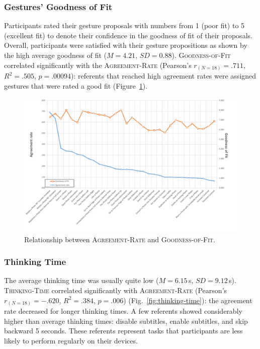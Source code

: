 \subsubsection{Gestures' Goodness of Fit}
Participants rated their gesture proposals with numbers from 1 (poor fit) to 5 (excellent fit) to denote their confidence in the goodness of fit of their proposals. Overall, participants were satisfied with their gesture propositions as shown by the high average goodness of fit ($M{=}4.21$, $SD{=}0.88$).
\textsc{Goodness-of-Fit} correlated significantly with the \textsc{Agreement-Rate} (Pearson's $r_{(N{=}18)}{=}.711$, $R^2{=}.505$, $p{=}.00094$): referents that reached high agreement rates were assigned gestures that were rated a good fit (Figure~\ref{fig:goodness-of-fit}).

\begin{figure}[ht]
	\centering
	\captionsetup{justification=centering}
	\includegraphics[width=.95\linewidth]{Figures/App-LUIGES/goodness-of-fit.pdf}
	\vspace{-24pt}
	\caption{Relationship between \textsc{Agreement-Rate} and \textsc{Goodness-of-Fit}.}
	\label{fig:goodness-of-fit}
\end{figure}

\subsubsection{Thinking Time}
The average thinking time was usually quite low ($M{=}6.15$\,s, $SD{=}9.12$\,s). 
\textsc{Thinking-Time} correlated significantly with \textsc{Agreement-Rate} (Pearson's $r_{(N=18)}{=}-.620$, $R^2{=}.384$, $p{=}.006$) (Fig.~\ref{fig:thinking-time}): the agreement rate decreased for longer thinking times. A few referents showed considerably higher than average thinking times: disable subtitles, enable subtitles, and skip backward 5 seconds. These referents represent tasks that participants are less likely to perform regularly on their devices.

